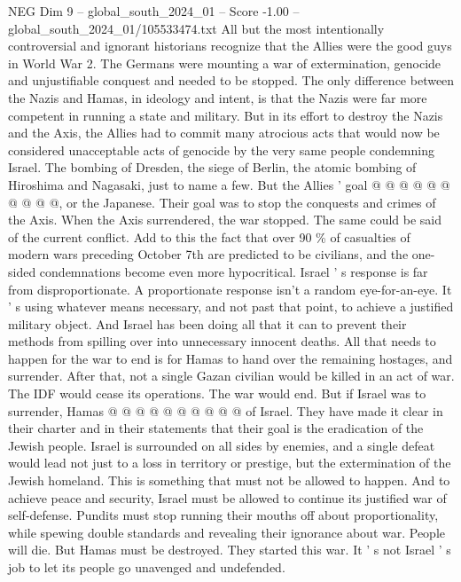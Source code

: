 \begin{textsample}{NEG Dim 9 – global\_south\_2024\_01 – Score -1.00 – global\_south\_2024\_01/105533474.txt}
All but the most intentionally controversial and ignorant historians recognize that the Allies were the good guys in World War 2.
The Germans were mounting a war of extermination, genocide and unjustifiable conquest and needed to be stopped.
The only difference between the Nazis and Hamas, in ideology and intent, is that the Nazis were far more competent in running a state and military.
But in its effort to destroy the Nazis and the Axis, the Allies had to commit many atrocious acts that would now be considered unacceptable acts of genocide by the very same people condemning Israel.
The bombing of Dresden, the siege of Berlin, the atomic bombing of Hiroshima and Nagasaki, just to name a few.
But the Allies ' goal @ @ @ @ @ @ @ @ @ @, or the Japanese.
Their goal was to stop the conquests and crimes of the Axis.
When the Axis surrendered, the war stopped.
The same could be said of the current conflict.
Add to this the fact that over 90 \% of casualties of modern wars preceding October 7th are predicted to be civilians, and the one-sided condemnations become even more hypocritical.
Israel ' s response is far from disproportionate.
A proportionate response isn't a random eye-for-an-eye.
It ' s using whatever means necessary, and not past that point, to achieve a justified military object.
And Israel has been doing all that it can to prevent their methods from spilling over into unnecessary innocent deaths.
All that needs to happen for the war to end is for Hamas to hand over the remaining hostages, and surrender.
After that, not a single Gazan civilian would be killed in an act of war.
The IDF would cease its operations.
The war would end.
But if Israel was to surrender, Hamas @ @ @ @ @ @ @ @ @ @ of Israel.
They have made it clear in their charter and in their statements that their goal is the eradication of the Jewish people.
Israel is surrounded on all sides by enemies, and a single defeat would lead not just to a loss in territory or prestige, but the extermination of the Jewish homeland.
This is something that must not be allowed to happen.
And to achieve peace and security, Israel must be allowed to continue its justified war of self-defense.
Pundits must stop running their mouths off about proportionality, while spewing double standards and revealing their ignorance about war.
People will die.
But Hamas must be destroyed.
They started this war.
It ' s not Israel ' s job to let its people go unavenged and undefended.

\end{textsample}
